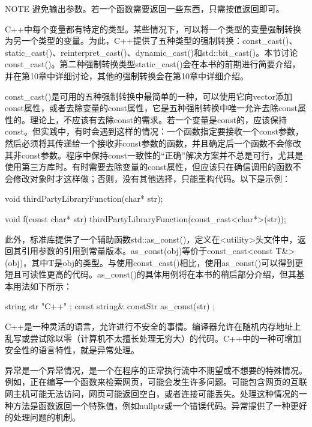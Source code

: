 \begin{myNotic}{NOTE}
避免输出参数。若一个函数需要返回一些东西，只需按值返回即可。
\end{myNotic}


C++中每个变量都有特定的类型。某些情况下，可以将一个类型的变量强制转换为另一个类型的变量。为此，C++提供了五种类型的强制转换：const\_cast()、static\_cast()、reinterpret\_cast()、dynamic\_cast()和std::bit\_cast()。本节讨论const\_cast()。第二种强制转换类型static\_cast()会在本书的前期进行简要介绍，并在第10章中详细讨论，其他的强制转换会在第10章中详细介绍。

const\_cast()是可用的五种强制转换中最简单的一种，可以使用它向vector添加const属性，或者去除变量的const属性，它是五种强制转换中唯一允许去除const属性的。理论上，不应该有去除const的需求。若一个变量是const的，应该保持const。但实践中，有时会遇到这样的情况：一个函数指定要接收一个const参数，然后必须将其传递给一个接收非const参数的函数，并且确定后一个函数不会修改其非const参数。程序中保持const一致性的“正确”解决方案并不总是可行，尤其是使用第三方库时。有时需要去除变量的const属性，但应该只在确信调用的函数不会修改对象时才这样做；否则，没有其他选择，只能重构代码。以下是示例：

\begin{cpp}
void thirdPartyLibraryFunction(char* str);

void f(const char* str)
{
    thirdPartyLibraryFunction(const_cast<char*>(str));
}
\end{cpp}

此外，标准库提供了一个辅助函数std::as\_const()，定义在<utility>头文件中，返回其引用参数的引用到常量版本。as\_const(obj)等价于const\_cast<const T\&>(obj)，其中T是obj的类型。与使用const\_cast()相比，使用as\_const()可以得到更短且可读性更高的代码。as\_const()的具体用例将在本书的稍后部分介绍，但其基本用法如下所示：

\begin{cpp}
string str { "C++" };
const string& constStr { as_const(str) };
\end{cpp}


C++是一种灵活的语言，允许进行不安全的事情。编译器允许在随机内存地址上乱写或尝试除以零（计算机不太擅长处理无穷大）的代码。C++中的一种可增加安全性的语言特性，就是异常处理。

异常是一个异常情况，是一个在程序的正常执行流中不期望或不想要的特殊情况。例如，正在编写一个函数来检索网页，可能会发生许多问题。可能包含网页的互联网主机可能无法访问，网页可能返回空白，或者连接可能丢失。处理这种情况的一种方法是函数返回一个特殊值，例如nullptr或一个错误代码。异常提供了一种更好的处理问题的机制。

